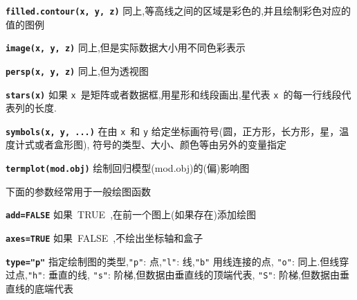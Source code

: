 \documentclass[landscape]{article}
\newcommand{\code}{\texttt}
\newcommand{\bcode}[1]{\texttt{\textbf{#1}}}
\begin{document}
\begin{multicols*}{3}
\bcode{filled.contour(x, y, z)}  同上,等高线之间的区域是彩色的,并且绘制彩色对应的值的图例

\bcode{image(x, y, z)}  同上,但是实际数据大小用不同色彩表示

\bcode{persp(x, y, z)}  同上,但为透视图

\bcode{stars(x)}  如果 \code{x}~是矩阵或者数据框,用星形和线段画出,星代表 \code{x}~的每一行线段代表列的长度.

\bcode{symbols(x, y, ...)}  在由 \code{x}~和 \code{y} 给定坐标画符号(圆，正方形，长方形，星，温度计式或者盒形图),
符号的类型、大小、颜色等由另外的变量指定

\bcode{termplot(mod.obj)}  绘制回归模型(mod.obj)的(偏)影响图

下面的参数经常用于一般绘图函数

\bcode{add=FALSE}  如果~TRUE~,在前一个图上(如果存在)添加绘图

\bcode{axes=TRUE}  如果~FALSE~,不绘出坐标轴和盒子

\bcode{type="p"}    指定绘制图的类型,\code{"p"}: 点,\code{"l"}: 线,\code{"b"} 用线连接的点,
\code{"o"}: 同上.但线穿过点,\code{"h"}: 垂直的线, \code{"s"}: 阶梯,但数据由垂直线的顶端代表,
 \code{"S"}: 阶梯,但数据由垂直线的底端代表


\end{multicols*}
\end{document}

